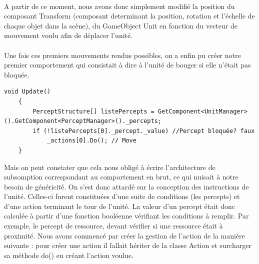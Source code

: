 \documentclass{report}
\begin{document}
\paragraph{}A partir de ce moment, nous avons donc simplement modifié la position du composant Transform (composant determinant la position, rotation et l'échelle de chaque objet dans la scène), du GameObject Unit en fonction du vecteur de mouvement voulu afin de déplacer l'unité.
\paragraph{}Une fois ces premiers mouvements rendus possibles, on a enfin pu créer notre premier comportement qui consistait à dire à l'unité de bouger si elle n'était pas bloquée.
\begin{lstlisting}[language={[Sharp]C},label={lst:unitScript}, caption=  Extrait du code du script Brain.cs première version.]
    void Update()
    {
        PerceptStructure[] listePercepts = GetComponent<UnitManager>().GetComponent<PerceptManager>()._percepts;
        if (!listePercepts[0]._percept._value) //Percept bloquée? faux
            _actions[0].Do(); // Move
    }

\end{lstlisting}
Mais on peut constater que cela nous obligé à écrire l'architecture de subsomption correspondant au comportement en brut, ce qui nuisait à notre besoin de généricité. On s'est donc attardé sur la conception des instructions de l'unité. Celles-ci furent constituées d'une suite de conditions (les percepts) et d'une action terminant le tour de l'unité. La valeur d'un percept était donc calculée à partir d'une fonction booléenne vérifiant les conditions à remplir. Par exemple, le percept de ressource, devant vérifier si une ressource était à proximité. Nous avons commencé par créer la gestion de l'action de la manière suivante : pour créer une action il fallait hériter de la classe Action et surcharger sa méthode do() en créant l'action voulue.
\end{document}
